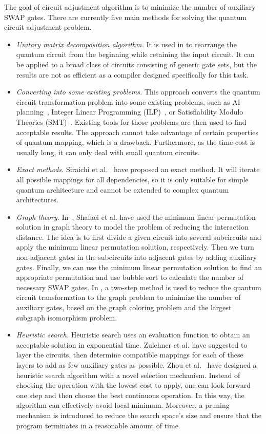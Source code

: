 \documentclass[runningheads]{llncs}
\begin{document}
The goal of circuit adjustment algorithm is to minimize the number of auxiliary SWAP gates. There are currently five main methods for solving the quantum circuit adjustment problem.
\begin{itemize}
  \item
\emph{Unitary matrix decomposition algorithm.} It is used in \cite{2019CNOT,2019Quantum} to rearrange the quantum circuit from the beginning while retaining the input circuit. It can be applied to a broad class of circuits consisting of generic gate sets, but the results are not as efficient as a compiler designed specifically for this task.
\item
\emph{Converting into some existing problems.} This approach converts the quantum circuit transformation problem into some existing problems, such as AI planning~\cite{2017Temporal,2018Integer}, Integer Linear Programming (ILP)~\cite{2019Almeida}, or Satisfiability Modulo Theories (SMT)~\cite{2019Murali}. Existing tools for those problems are then used to find acceptable results. The approach cannot take advantage of certain properties of quantum mapping, which is a drawback. Furthermore, as the time cost is usually long, it can only deal with small quantum circuits.
\item
\emph{Exact methods.}
Siraichi et al.~\cite{2018QubitSiraichi} have proposed an exact method. It will iterate all possible mappings for all dependencies, so it is only suitable for simple quantum architecture and cannot be extended to complex quantum architectures.
\item
\emph{Graph theory.} 
In~\cite{Shafaei2013}, Shafaei et al. have used the minimum linear permutation solution in graph theory to model the problem of reducing the interaction distance. The idea is to first divide a given circuit into several subcircuits and apply the minimum linear permutation solution, respectively. Then we turn non-adjacent gates in the subcircuits into adjacent gates by adding auxiliary gates. Finally, we can use the minimum linear permutation solution to find an appropriate permutation and use bubble sort to calculate the number of necessary SWAP gates. In \cite{Guerreschi2018,Matsuo2019}, a two-step method is used to reduce the quantum circuit transformation to the graph problem to minimize the number of auxiliary gates, based on the graph coloring problem and the largest subgraph isomorphism problem.
\item
\emph{Heuristic search.}
Heuristic search uses an evaluation function to obtain an acceptable solution in exponential time. Zulehner et al. \cite{Zulehner2017} have suggested to layer the circuits, then determine compatible mappings for each of these layers to add as few auxiliary gates as possible. Zhou et al.~\cite{Xiangzhen2020} have designed a heuristic search algorithm with a novel selection mechanism. Instead of choosing the operation with the lowest cost to apply, one can look forward one step and then choose the best continuous operation. In this way, the algorithm can effectively avoid local minimum. Moreover, a pruning mechanism is introduced to reduce the search space's size and ensure that the program terminates in a reasonable amount of time.


\end{itemize}
\end{document}
